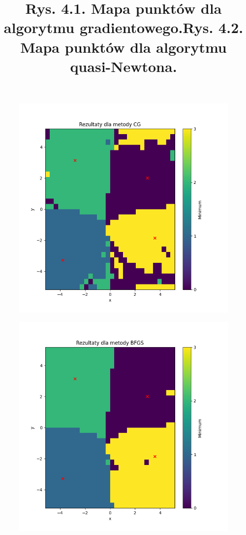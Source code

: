 \documentclass{article}
\begin{document}
\begin{figure}[h!]
  \includegraphics[scale=0.8]{zad4.1.png}
  \title{Rys. 4.1. Mapa punktów dla algorytmu gradientowego.}
  \centering
\end{figure}

\begin{figure}[h!]
  \includegraphics[scale=0.8]{zad4.2.png}
  \title{Rys. 4.2. Mapa punktów dla algorytmu quasi-Newtona.}
  \centering
\end{figure}
\end{document}
